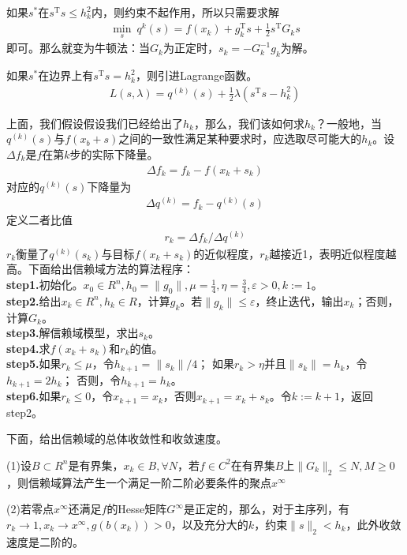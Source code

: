         \par
        如果$s^*$在$s^\mathrm{T} s \leqslant h_k^2$内，则约束不起作用，所以只需要求解
         \begin{align*}
         \mathop {\min} \limits_s \  q^k (s)=f(x_k)+g^\mathrm{T} _k s+\frac 12 s^\mathrm{T} G_ks
        \end{align*}
        即可。那么就变为牛顿法：当$G_k$为正定时，$s_k=-G_k^{-1}g_k$为解。
        \par
        如果$s^*$在边界上有$s^\mathrm{T} s=h_k^2$，则引进Lagrange函数。
        \begin{align*}
        L(s,\lambda ) = q^{(k)}(s) + \frac 12 \lambda (s^\mathrm{T} s - h_k^2)
        \end{align*}
        \par
        上面，我们假设假设我们已经给出了$h_k$，那么，我们该如何求$h_k$？一般地，当$q^{(k)}(s)$与$f(x_b+s)$之间的一致性满足某种要求时，应选取尽可能大的$h_k$。设$\Delta f_k$是$f$在第$k$步的实际下降量。
        \begin{align*}
         \Delta f_k = f_k - f (x_k + s_k)
        \end{align*}
        对应的$q^{(k)}(s)$下降量为
         \begin{align*}
         \Delta q^{(k)} = f_k - q^{(k)}(s)
        \end{align*}
        定义二者比值
        \begin{align*}
         r_k = \Delta f_k / \Delta q^{(k)}
        \end{align*}
        $r_k$衡量了$q^{(k)}(s_k)$与目标$f(x_k+s_k)$的近似程度，$r_k$越接近1，表明近似程度越高。下面给出信赖域方法的算法程序：\\
        \textbf{step1.}初始化。$x_0 \in R^n,h_0=\|g_0\|,\mu = \frac 14, \eta = \frac 34 ,\varepsilon >0,k:=1$。\\
        \textbf{step2.}给出$x_k \in R^n,h_k \in R$，计算$g_k$。若$\|g_k\| \leqslant \varepsilon $，终止迭代，输出$x_k$；否则，计算$G_k$。\\
        \textbf{step3.}解信赖域模型，求出$s_k$。\\
        \textbf{step4.}求$f(x_k+s_k)$和$r_k$的值。\\
        \textbf{step5.}如果$r_k \leqslant  \mu $，令$h_{k+1} = \|s_k\|/4$；
        如果$r_k > \eta $并且$\|s_k\| = h_k$，令$h_{k+1}=2h_k$；
        否则，令$h_{k+1}=h_k$。\\
        \textbf{step6.}如果$r_k \leqslant 0 $，令$x_{k+1} = x_k$，否则$x_{k+1}=x_k+s_k$。令$k:=k+1$，返回step2。
        \par
        下面，给出信赖域的总体收敛性和收敛速度。
        \par
        (1)设$B \subset R^n$是有界集，$x_k \in B,\forall N$，若$f \in C^2$在有界集$B$上$\|G_k\|_2 \leqslant N,M \geqslant 0$，则信赖域算法产生一个满足一阶二阶必要条件的聚点$x^{\infty }$
        \par
        (2)若零点$x^{\infty }$还满足$f$的Hesse矩阵$G^{\infty}$是正定的，那么，对于主序列，有$r_k \rightarrow 1,x_k \to x^{\infty},g(b(x_k))>0$，以及充分大的$k$，约束$\|s\|_2 < h_k$，此外收敛速度是二阶的。
